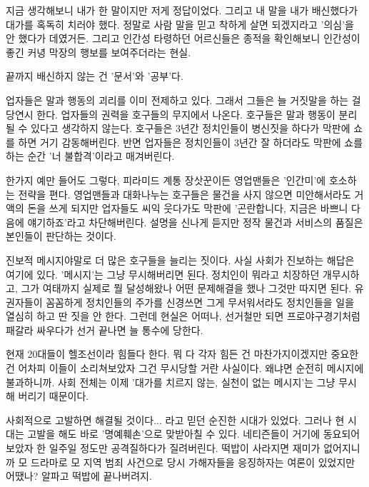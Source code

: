지금 생각해보니 내가 한 말이지만 저게 정답이었다. 그리고 내 말을 내가 배신했다가 대가를 혹독히 치러야 했다.
정말로 사람 말을 믿고 착하게 살면 되겠지라고 '의심'을 안 했다가 데였거든.
그리고 인간성 타령하던 어르신들은 종적을 확인해보니 인간성이 좋긴 커녕 막장의 행보를 보여주더라는 현실.
\vspace{5mm}

끝까지 배신하지 않는 건 '문서'와 '공부'다.
\vspace{5mm}

업자들은 말과 행동의 괴리를 이미 전제하고 있다. 그래서 그들은 늘 거짓말을 하는 걸 당연시 한다.
업자들의 권력을 호구들의 무지에서 나온다. 호구들은 말과 행동이 분리될 수 있다고 생각하지 않는다.
호구들은 3년간 정치인들이 병신짓을 하다가 막판에 쇼를 하면 거기 감동해버린다.
반면 업자들은 정치인들이 3년간 잘 하더라도 막판에 쇼를 하는 순간 '너 불합격'이라고 매겨버린다.
\vspace{5mm}

한가지 예만 들어도 그렇다, 피라미드 계통 장삿꾼이든 영업맨들은 '인간미'에 호소하는 전략을 편다.
영업맨들과 대화나누는 호구들은 물건을 사지 않으면 미안해서라도 거액의 돈을 쓰게 되지만
업자들도 씨익 웃다가도 막판에 '곤란합니다, 지금은 바쁘니 다음에 얘기하죠'라고 차단해버린다.
설명을 신나게 듣지만 정작 물건과 서비스의 품질은 본인들이 판단하는 것이다.
\vspace{5mm}

진보적 메시지야말로 더 많은 호구들을 늘리는 짓이다.
사실 사회가 진보하는 해답은 여기에 있다. '메시지'는 그냥 무시해버리면 된다.
정치인이 뭐라고 치장하던 개무시하고, 그가 여태까지 실제로 뭘 달성해왔나 어떤 문제해결을 했나 그것만 따지면 된다.
유권자들이 꼼꼼하게 정치인들의 주가를 신경쓰면 그게 무서워서라도 정치인들을 일을 열심히 하고 딴 짓을 안 한다.
그런데 현실은 어떠나, 선거철만 되면 프로야구경기처럼 패갈라 싸우다가 선거 끝나면 늘 통수에 당한다.
\vspace{5mm}

현재 20대들이 헬조선이라 힘들다 한다. 뭐 다 각자 힘든 건 마찬가지이겠지만
중요한 건 어차피 이들이 소리쳐보았자 그건 무시당할 거란 사실이다. 왜냐면 순전히 메시지에 불과하니까.
사회 전체는 이제 '대가를 치르지 않는, 실천이 없는 메시지'는 그냥 무시해 버리기 때문이다.
\vspace{5mm}

사회적으로 고발하면 해결될 것이다... 라고 믿던 순진한 시대가 있었다.
그러나 현 시대는 고발을 해도 바로 '명예훼손'으로 맞받아칠 수 있다.
네티즌들이 거기에 동요되어보았자 한 일주일 정도만 공격질하다가 질려버린다. 떡밥이 사라지면 재미가 없어지니까
모 드라마로 모 지역 범죄 사건으로 당시 가해자들을 응징하자는 여론이 있었지만 어땠나? 알파고 떡밥에 끝나버려지.
\vspace{5mm}






